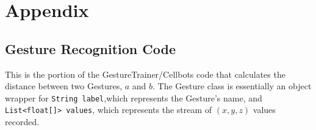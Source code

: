 \documentclass[12pt, letterpaper]{report}
\begin{document}



\pagestyle{myheadings}
\markright{}
\chapter*{Appendix}
\section*{Gesture Recognition Code}
This is the portion of the GestureTrainer/Cellbots code that calculates the distance between two Gestures, $a$ and $b$. The Gesture class is essentially an object wrapper for \texttt{String label},which represents the Gesture's name, and \texttt{List<float[]> values}, which represents the stream of $(x, y, z)$ values recorded.

\singlespacing
{}

\end{document}
